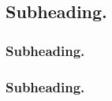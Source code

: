 \subsection*{Subheading.}

\lipsum[1]


\subsubsection*{Subheading.}

\lipsum[2]


\subsubsection*{Subheading.}

\lipsum[3]